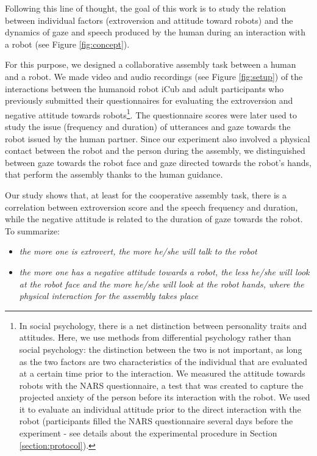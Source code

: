 \documentclass[twocolumn]{svjour3}          %
\begin{document}
Following this line of thought, the goal of this work is to study the relation between individual factors (extroversion and attitude toward robots) and the dynamics of gaze and speech produced by the human during an interaction with a robot (see Figure \ref{fig:concept}).

For this purpose, we designed a collaborative assembly task between a human and a robot. We made video and audio recordings (see Figure \ref{fig:setup}) of the interactions between the humanoid robot iCub and adult participants who previously submitted their questionnaires for evaluating the extroversion and negative attitude towards robots\footnote{In social psychology, there is a net distinction between personality traits and attitudes. Here, we use methods from differential psychology rather than social psychology: the distinction between the two is not important, as long as the two factors are two characteristics of the individual that are evaluated at a certain time prior to the interaction. We measured the attitude towards robots with the NARS questionnaire, a test that was created to capture the projected anxiety of the person before its interaction with the robot. We used it to evaluate an individual attitude prior to the direct interaction with the robot (participants filled the NARS questionnaire several days before the experiment - see details about the experimental procedure in Section \ref{section:protocol}).}. 
The questionnaire scores were later used to study the issue (frequency and duration) of utterances and gaze towards the robot issued by the human partner. Since our experiment also involved a physical contact between the robot and the person during the assembly, we distinguished between gaze towards the robot face and gaze directed towards the robot's hands, that perform the assembly thanks to the human guidance.


Our study shows that, at least for the cooperative assembly task, there is a correlation between extroversion score and the speech frequency and duration, while the negative attitude is related to the duration of gaze towards the robot. To summarize:
\begin{itemize}
\item \emph{the more one is extrovert, the more he/she will talk to the robot}
\item \emph{the more one has a negative attitude towards a robot, the less he/she will look at the robot face and the more he/she will look at the robot hands, where the physical interaction for the assembly takes place}
\end{itemize}
\end{document}
